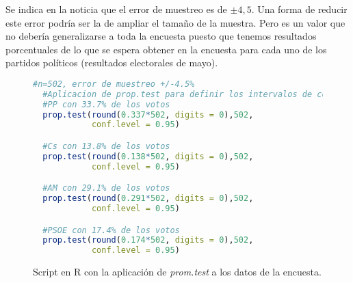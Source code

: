 \documentclass[11pt,a4paper]{article}
\begin{document}
Se indica en la noticia que el error de muestreo es de $\pm4,5$. Una forma de reducir este error podría ser la de ampliar el tamaño de la muestra. Pero es un valor que no debería generalizarse a toda la encuesta puesto que tenemos resultados porcentuales de lo que se espera obtener en la encuesta para cada uno de los partidos políticos (resultados electorales de mayo).

\begin{figure}
\centering
\begin{lstlisting}[language=R]
  #n=502, error de muestreo +/-4.5%
  #Aplicacion de prop.test para definir los intervalos de confianza
  #PP con 33.7% de los votos
  prop.test(round(0.337*502, digits = 0),502,
            conf.level = 0.95)

  #Cs con 13.8% de los votos
  prop.test(round(0.138*502, digits = 0),502,
            conf.level = 0.95)

  #AM con 29.1% de los votos
  prop.test(round(0.291*502, digits = 0),502,
            conf.level = 0.95)

  #PSOE con 17.4% de los votos
  prop.test(round(0.174*502, digits = 0),502,
            conf.level = 0.95)
\end{lstlisting}
\caption{Script en R con la aplicación de \textit{prom.test} a los datos de la encuesta.}
\label{fig:proptest}
\end{figure}
\end{document}
